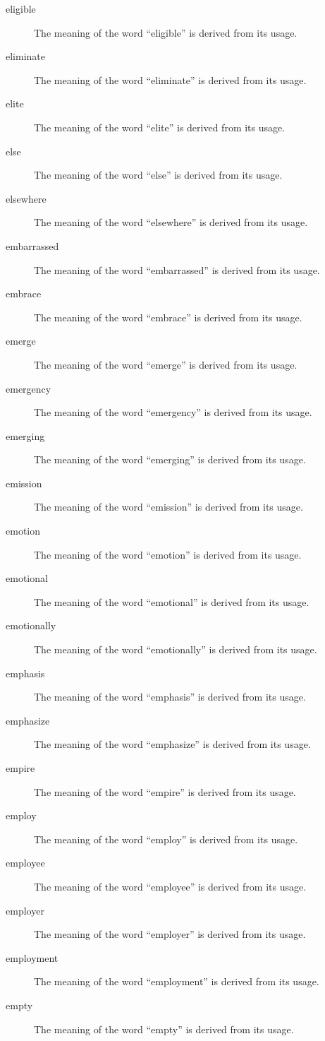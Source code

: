 \documentclass[12pt, letterpaper]{memoir}
\begin{document}
\begin{description}
\item[eligible] The meaning of the word ``eligible'' is derived from its usage.
\item[eliminate] The meaning of the word ``eliminate'' is derived from its usage.
\item[elite] The meaning of the word ``elite'' is derived from its usage.
\item[else] The meaning of the word ``else'' is derived from its usage.
\item[elsewhere] The meaning of the word ``elsewhere'' is derived from its usage.
\item[embarrassed] The meaning of the word ``embarrassed'' is derived from its usage.
\item[embrace] The meaning of the word ``embrace'' is derived from its usage.
\item[emerge] The meaning of the word ``emerge'' is derived from its usage.
\item[emergency] The meaning of the word ``emergency'' is derived from its usage.
\item[emerging] The meaning of the word ``emerging'' is derived from its usage.
\item[emission] The meaning of the word ``emission'' is derived from its usage.
\item[emotion] The meaning of the word ``emotion'' is derived from its usage.
\item[emotional] The meaning of the word ``emotional'' is derived from its usage.
\item[emotionally] The meaning of the word ``emotionally'' is derived from its usage.
\item[emphasis] The meaning of the word ``emphasis'' is derived from its usage.
\item[emphasize] The meaning of the word ``emphasize'' is derived from its usage.
\item[empire] The meaning of the word ``empire'' is derived from its usage.
\item[employ] The meaning of the word ``employ'' is derived from its usage.
\item[employee] The meaning of the word ``employee'' is derived from its usage.
\item[employer] The meaning of the word ``employer'' is derived from its usage.
\item[employment] The meaning of the word ``employment'' is derived from its usage.
\item[empty] The meaning of the word ``empty'' is derived from its usage.

\end{description}
\end{document}
